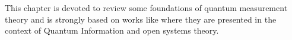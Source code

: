 
This chapter is devoted to review some
foundations of quantum measurement theory
and is strongly based on works like
\cite{PreskillNotes, Haroche_Exploring, Nakahara, NielsenChuang, open_systems}
where they are presented in the context of
Quantum Information and open systems theory.
